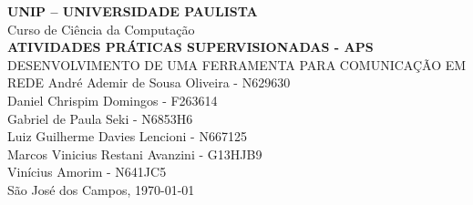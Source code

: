 
\frenchspacing

\newpage

\pretextual

\begin{capa}
	\begin{center}
		\begin{minipage}{1\textwidth}
			\large\centering{}
		\end{minipage}
	\end{center}
	\begin{center}
		\LARGE\textbf{UNIP -- UNIVERSIDADE PAULISTA\\}
		\LARGE {Curso de Ciência da Computação}\\
		\vfill
		\ABNTEXchapterfont\Large\textbf{\MakeUppercase{ATIVIDADES PRÁTICAS SUPERVISIONADAS - APS}}
		\\\small{DESENVOLVIMENTO DE UMA FERRAMENTA PARA COMUNICAÇÃO EM REDE}
		\vfill
		\normalsize{
			André Ademir de Sousa Oliveira - N629630\\
			Daniel Chrispim Domingos - F263614\\
			Gabriel de Paula Seki - N6853H6\\
			Luiz Guilherme Davies Lencioni - N667125\\
			Marcos Vinicius Restani Avanzini - G13HJB9\\
			Vinícius Amorim - N641JC5\\
		}
		\vfill
		São José dos Campos, \today
	\end{center}
\end{capa}

